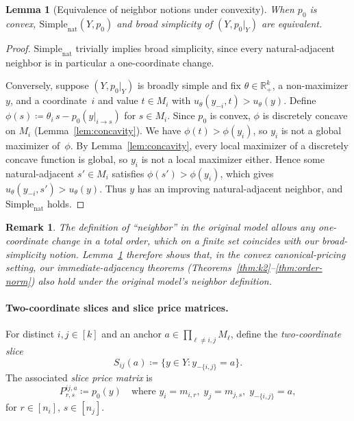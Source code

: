 \documentclass[11pt]{article}
\newtheorem{lemma}[theorem]{Lemma}
\newtheorem{remark}[theorem]{Remark}
\newcommand{\R}{\mathbb{R}}
\newcommand{\Rp}{\R_+}
\newcommand{\Simplenat}{\mathrm{Simple}_{\mathrm{nat}}}
\begin{document}
\begin{lemma}[Equivalence of neighbor notions under convexity]%
\label{lem:broad-narrow}
When $p_0$ is convex, $\Simplenat(Y, p_0)$ and broad simplicity
of $(Y, p_0|_Y)$ are equivalent.
\end{lemma}

\begin{proof}
$\Simplenat$ trivially implies broad simplicity, since every
natural-adjacent neighbor is in particular a one-coordinate change.

Conversely, suppose $(Y, p_0|_Y)$ is broadly simple and fix
$\theta \in \Rp^k$, a non-maximizer $y$, and a coordinate~$i$ and
value $t \in M_i$ with $u_\theta(y_{-i}, t) > u_\theta(y)$.
Define $\phi(s) \coloneqq \theta_i\, s - p_0(y|_{i \to s})$ for
$s \in M_i$.  Since $p_0$ is convex, $\phi$ is discretely concave
on $M_i$ (Lemma~\ref{lem:concavity}).  We have
$\phi(t) > \phi(y_i)$, so $y_i$ is not a global maximizer of~$\phi$.
By Lemma~\ref{lem:concavity}, every local maximizer of a discretely
concave function is global, so $y_i$ is not a local maximizer either.
Hence some natural-adjacent $s' \in M_i$ satisfies
$\phi(s') > \phi(y_i)$, which gives $u_\theta(y_{-i}, s') > u_\theta(y)$.
Thus $y$ has an improving natural-adjacent neighbor, and $\Simplenat$
holds.
\end{proof}

\begin{remark}\label{rem:model-pdf}
The definition of ``neighbor'' in the original model
allows any one-coordinate change in a total order, which on a finite
set coincides with our broad-simplicity notion.
Lemma~\ref{lem:broad-narrow} therefore shows that, in the convex
canonical-pricing setting, our immediate-adjacency theorems
(Theorems~\ref{thm:k2}--\ref{thm:order-norm}) also hold under the
original model's neighbor definition.
\end{remark}

\paragraph{Two-coordinate slices and slice price matrices.}
For distinct $i,j \in [k]$ and an anchor $a \in \prod_{\ell \neq i,j} M_\ell$,
define the \emph{two-coordinate slice}
\[
  S_{ij}(a) \coloneqq \bigl\{y \in Y : y_{-\{i,j\}} = a \bigr\}.
\]
The associated \emph{slice price matrix} is
\[
  P^{ij,a}_{r,s} \coloneqq p_0(y) \quad \text{where } y_i = m_{i,r},\; y_j = m_{j,s},\; y_{-\{i,j\}} = a,
\]
for $r \in [n_i]$, $s \in [n_j]$.
\end{document}
